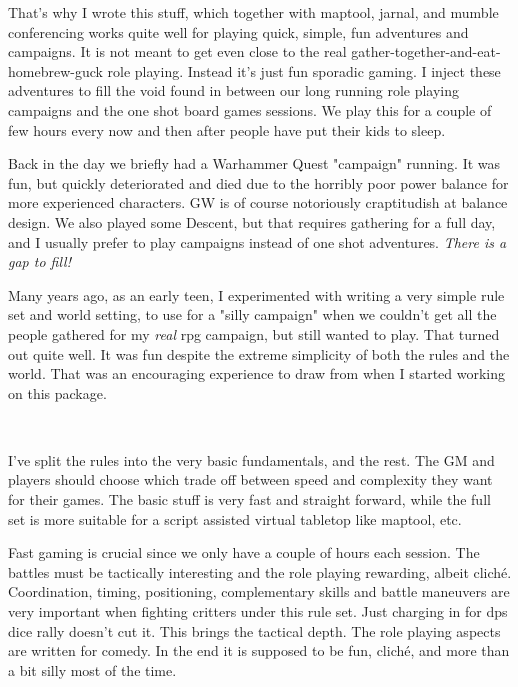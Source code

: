 \documentclass[11pt, twoside, titlepage, a4paper]{report}
\begin{document}
That's why I wrote this stuff, which together with maptool, jarnal, and mumble conferencing works quite well for playing quick, simple, fun adventures and campaigns. It is not meant to get even close to the real gather-together-and-eat-homebrew-guck role playing. Instead it's just fun sporadic gaming. I inject these adventures to fill the void found in between our long running role playing campaigns and the one shot board games sessions.
We play this for a couple of few hours every now and then after people have put their kids to sleep.

Back in the day we briefly had a Warhammer Quest "campaign" running. It was fun, but quickly deteriorated and died due to the horribly poor power balance for more experienced characters. GW is of course notoriously craptitudish at balance design. We also played some Descent, but that requires gathering for a full day, and I usually prefer to play campaigns instead of one shot adventures. \emph{There is a gap to fill!}

Many years ago, as an early teen, I experimented with writing a very simple rule set and world setting, to use for a "silly campaign" when we couldn't get all the people gathered for my \emph{real} rpg campaign, but still wanted to play. That turned out quite well. It was fun despite the extreme simplicity of both the rules and the world. That was an encouraging experience to draw from when I started working on this package.

\

I've split the rules into the very basic fundamentals, and the rest. The GM and players should choose which trade off between speed and complexity they want for their games. The basic stuff is very fast and straight forward, while the full set is more suitable for a script assisted virtual tabletop like maptool, etc.

Fast gaming is crucial since we only have a couple of hours each session. The battles must be tactically interesting and the role playing rewarding, albeit cliché. Coordination, timing, positioning, complementary skills and battle maneuvers are very important when fighting critters under this rule set. Just charging in for dps dice rally doesn't cut it. This brings the tactical depth. The role playing aspects are written for comedy. In the end it is supposed to be fun, cliché, and more than a bit silly most of the time.


\newpage
\end{document}
